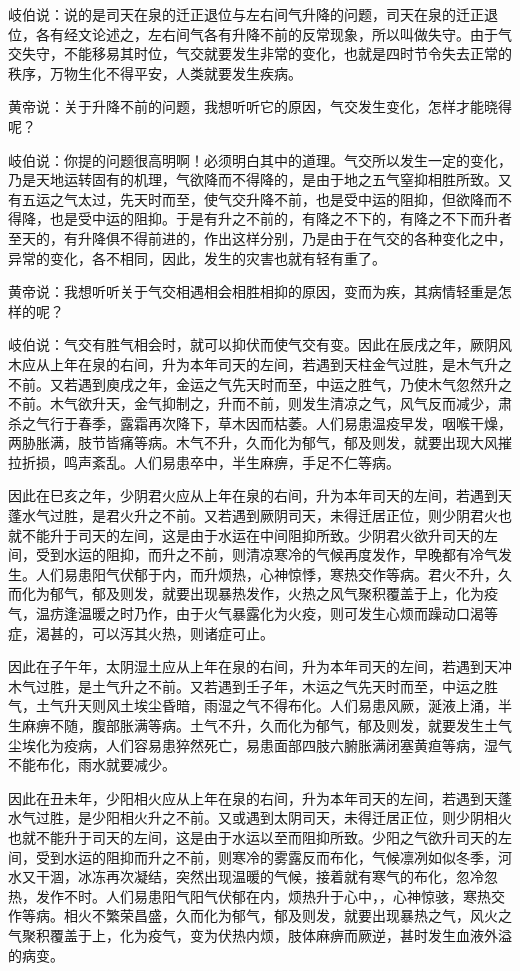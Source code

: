 \documentclass[12pt,UTF8]{ctexbook}
\begin{document}
岐伯说：说的是司天在泉的迁正退位与左右间气升降的问题，司天在泉的迁正退位，各有经文论述之，左右间气各有升降不前的反常现象，所以叫做失守。由于气交失守，不能移易其时位，气交就要发生非常的变化，也就是四时节令失去正常的秩序，万物生化不得平安，人类就要发生疾病。

黄帝说：关于升降不前的问题，我想听听它的原因，气交发生变化，怎样才能晓得呢？

岐伯说：你提的问题很高明啊！必须明白其中的道理。气交所以发生一定的变化，乃是天地运转固有的机理，气欲降而不得降的，是由于地之五气窒抑相胜所致。又有五运之气太过，先天时而至，使气交升降不前，也是受中运的阻抑，但欲降而不得降，也是受中运的阻抑。于是有升之不前的，有降之不下的，有降之不下而升者至天的，有升降俱不得前进的，作出这样分别，乃是由于在气交的各种变化之中，异常的变化，各不相同，因此，发生的灾害也就有轻有重了。

黄帝说：我想听听关于气交相遇相会相胜相抑的原因，变而为疾，其病情轻重是怎样的呢？

岐伯说：气交有胜气相会时，就可以抑伏而使气交有变。因此在辰戌之年，厥阴风木应从上年在泉的右间，升为本年司天的左间，若遇到天柱金气过胜，是木气升之不前。又若遇到庾戌之年，金运之气先天时而至，中运之胜气，乃使木气忽然升之不前。木气欲升天，金气抑制之，升而不前，则发生清凉之气，风气反而减少，肃杀之气行于春季，露霜再次降下，草木因而枯萎。人们易患温疫早发，咽喉干燥，两胁胀满，肢节皆痛等病。木气不升，久而化为郁气，郁及则发，就要出现大风摧拉折损，鸣声紊乱。人们易患卒中，半生麻痹，手足不仁等病。

因此在巳亥之年，少阴君火应从上年在泉的右间，升为本年司天的左间，若遇到天蓬水气过胜，是君火升之不前。又若遇到厥阴司天，未得迁居正位，则少阴君火也就不能升于司天的左间，这是由于水运在中间阻抑所致。少阴君火欲升司天的左间，受到水运的阻抑，而升之不前，则清凉寒冷的气候再度发作，早晚都有冷气发生。人们易患阳气伏郁于内，而升烦热，心神惊悸，寒热交作等病。君火不升，久而化为郁气，郁及则发，就要出现暴热发作，火热之风气聚积覆盖于上，化为疫气，温疠逢温暖之时乃作，由于火气暴露化为火疫，则可发生心烦而躁动口渴等症，渴甚的，可以泻其火热，则诸症可止。

因此在子午年，太阴湿土应从上年在泉的右间，升为本年司天的左间，若遇到天冲木气过胜，是土气升之不前。又若遇到壬子年，木运之气先天时而至，中运之胜气，土气升天则风土埃尘昏暗，雨湿之气不得布化。人们易患风厥，涎液上涌，半生麻痹不随，腹部胀满等病。土气不升，久而化为郁气，郁及则发，就要发生土气尘埃化为疫病，人们容易患猝然死亡，易患面部四肢六腑胀满闭塞黄疸等病，湿气不能布化，雨水就要减少。

因此在丑未年，少阳相火应从上年在泉的右间，升为本年司天的左间，若遇到天蓬水气过胜，是少阳相火升之不前。又或遇到太阴司天，未得迁居正位，则少阴相火也就不能升于司天的左间，这是由于水运以至而阻抑所致。少阳之气欲升司天的左间，受到水运的阻抑而升之不前，则寒冷的雾露反而布化，气候凛冽如似冬季，河水又干涸，冰冻再次凝结，突然出现温暖的气候，接着就有寒气的布化，忽冷忽热，发作不时。人们易患阳气阳气伏郁在内，烦热升于心中，，心神惊骇，寒热交作等病。相火不繁荣昌盛，久而化为郁气，郁及则发，就要出现暴热之气，风火之气聚积覆盖于上，化为疫气，变为伏热内烦，肢体麻痹而厥逆，甚时发生血液外溢的病变。
\end{document}
